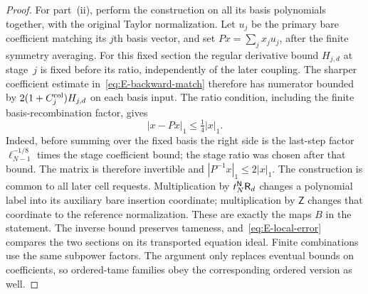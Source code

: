 \begin{proof}
For part~(ii), perform the construction on all its basis polynomials together, with the original Taylor normalization. Let $u_j$ be the primary bare coefficient matching its $j$th basis vector, and set $Px=\sum_jx_ju_j$, after the finite symmetry averaging. For this fixed section the regular derivative bound $H_{j,d}$ at stage~$j$ is fixed before its ratio, independently of the later coupling. The sharper coefficient estimate in~\eqref{eq:E-backward-match} therefore has numerator bounded by $2(1+C^{\rm col}_j)H_{j,d}$ on each basis input. The ratio condition, including the finite basis-recombination factor, gives
\begin{equation*}
 \left|x-Px\right|_1\le\tfrac14|x|_1.
\end{equation*}
Indeed, before summing over the fixed basis the right side is the last-step factor $\ell_{N-1}^{-1/8}$ times the stage coefficient bound; the stage ratio was chosen after that bound. The matrix is therefore invertible and $|P^{-1}x|_1\le2|x|_1$. The construction is common to all later cell requests. Multiplication by $t_N^{\mathsf{N}}\mathsf R_d$ changes a polynomial label into its auxiliary bare insertion coordinate; multiplication by $\mathsf Z$ changes that coordinate to the reference normalization. These are exactly the maps $B$ in the statement. The inverse bound preserves tameness, and~\eqref{eq:E-local-error} compares the two sections on its transported equation ideal. Finite combinations use the same subpower factors. The argument only replaces eventual bounds on coefficients, so ordered-tame families obey the corresponding ordered version as well.
\end{proof}
